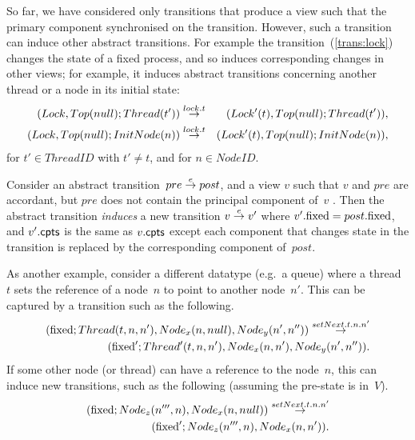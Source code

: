 
So far, we have considered only transitions that produce a view such that the
primary component synchronised on the transition.  However, such a transition
can induce other abstract transitions.  For example the
transition~(\ref{trans:lock}) changes the state of a fixed process, and so
induces corresponding changes in other views; for example, it induces abstract
transitions concerning another thread or a node in its initial state:
%
\begin{eqnarray*}
(Lock, Top(null); Thread(t')) & \stackrel{lock.t}\rightarrow & 
  (Lock'(t), Top(null); Thread(t')), \\
(Lock, Top(null); InitNode(n)) & \stackrel{lock.t}\rightarrow & 
  (Lock'(t), Top(null); InitNode(n)),
\end{eqnarray*}
%
for $t' \in ThreadID$ with $t' \ne t$, and for $n \in NodeID$.




\begin{definition}
Consider an abstract transition~$pre \stackrel{e}\rightarrow post$, and a view $v$ such that
$v$ and $pre$ are accordant, but $pre$ does not contain the principal
component of~$v$ .  Then the abstract transition \emph{induces} a
new transition $v \stackrel{e}\rightarrow v'$ where $v'.\mathrm{fixed} = post.\mathrm{fixed}$, and
$v'.\mathsf{cpts}$ is the same as $v.\mathsf{cpts}$ except each component that changes state
in the transition is replaced by the corresponding component of~$post$.
\end{definition}

As another example, consider a different datatype (e.g.~a queue) where a
thread~$t$ sets the  reference of a node~$n$ to point to another
node~$n'$.  This can be captured by a transition such as the following.
\[
\begin{align}
(\mathrm{fixed}; Thread(t, n, n'), Node_x(n, null), Node_y(n', n'')) 
  \stackrel{setNext.t.n.n'}\rightarrow \\
\qquad (\mathrm{fixed}'; Thread'(t, n, n'), Node_x(n, n'), Node_y(n', n'')).
\end{align}
\]
If some other node (or thread) can have a reference to the node~$n$, this can
induce new transitions, such as the following (assuming the pre-state is
in~$V$). 
\[
\begin{align}
(\mathrm{fixed}; Node_z(n''', n), Node_x(n, null))  \stackrel{setNext.t.n.n'}\rightarrow \\
\qquad  (\mathrm{fixed}'; Node_z(n''', n), Node_x(n, n')).
\end{align}
\]


